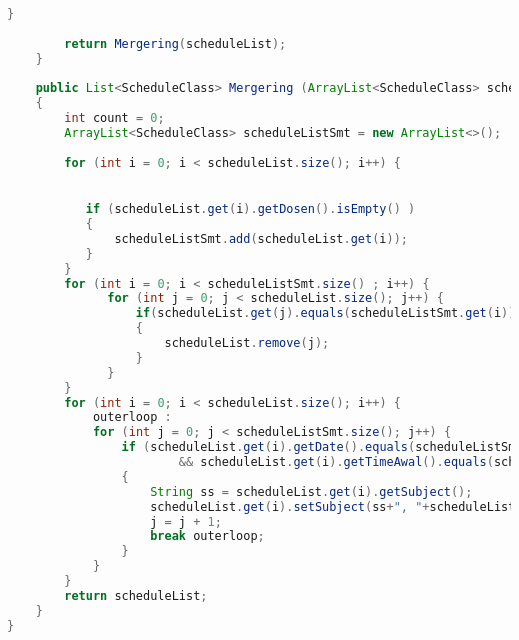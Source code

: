 \begin{lstlisting}[language=Java,basicstyle=\tiny,caption=ExcelConverter.java,label=lst:ExcelConverter]
        }
        
        return Mergering(scheduleList);
    }
    
    public List<ScheduleClass> Mergering (ArrayList<ScheduleClass> scheduleList)
    {
        int count = 0;
        ArrayList<ScheduleClass> scheduleListSmt = new ArrayList<>();
        
        for (int i = 0; i < scheduleList.size(); i++) {

           
           if (scheduleList.get(i).getDosen().isEmpty() )
           {
               scheduleListSmt.add(scheduleList.get(i));
           }         
        }
        for (int i = 0; i < scheduleListSmt.size() ; i++) {
              for (int j = 0; j < scheduleList.size(); j++) {
                  if(scheduleList.get(j).equals(scheduleListSmt.get(i)))
                  {
                      scheduleList.remove(j);
                  }
              }
        }
        for (int i = 0; i < scheduleList.size(); i++) {
            outerloop :
            for (int j = 0; j < scheduleListSmt.size(); j++) {
                if (scheduleList.get(i).getDate().equals(scheduleListSmt.get(j).getDate())
                        && scheduleList.get(i).getTimeAwal().equals(scheduleListSmt.get(j).getTimeAwal()))
                {
                    String ss = scheduleList.get(i).getSubject();
                    scheduleList.get(i).setSubject(ss+", "+scheduleListSmt.get(j).getSubject());
                    j = j + 1;
                    break outerloop;
                }
            }
        }
        return scheduleList;
    }
}

\end{lstlisting}

